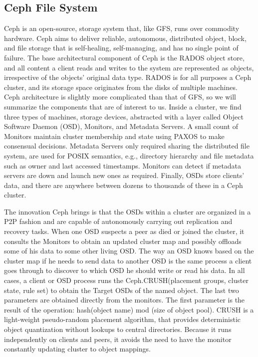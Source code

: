 \documentclass[runningheads]{llncs}
\begin{document}
\newpage\subsection{Ceph File System}
Ceph \cite{ceph} is an open-source, storage system that, like GFS, runs over commodity hardware. Ceph aims to deliver reliable, autonomous, distributed object, block, and file storage that is self-healing, self-managing, and has no single point of failure. The base architectural component of Ceph is the RADOS object store, and all content a client reads and writes to the system are represented as objects, irrespective of the objects' original data type. RADOS is for all purposes a Ceph cluster, and its storage space originates from the disks of multiple machines. Ceph architecture is slightly more complicated than that of GFS, so we will summarize the components that are of interest to us. Inside a cluster, we find three types of machines, storage devices, abstracted with a layer called Object Software Daemon (OSD), Monitors, and Metadata Servers. A small count of Monitors maintain cluster membership and state using PAXOS \cite{paxos} to make consensual decisions. Metadata Servers only required sharing the distributed file system, are used for POSIX semantics, e.g., directory hierarchy and file metadata such as owner and last accessed timestamps. Monitors can detect if metadata servers are down and launch new ones as required. Finally, OSDs store clients' data, and there are anywhere between dozens to thousands of these in a Ceph cluster.

The innovation Ceph brings is that the OSDs within a cluster are organized in a P2P fashion and are capable of autonomously carrying out replication and recovery tasks. When one OSD suspects a peer as died or joined the cluster, it consults the Monitors to obtain an updated cluster map and possibly offloads some of his data to some other living OSD. The way an OSD knows based on the cluster map if he needs to send data to another OSD is the same process a client goes through to discover to which OSD he should write or read his data. In all cases, a client or OSD process runs the Ceph.CRUSH(placement groups, cluster state, rule set) to obtain the Target OSDs of the named object. The last two parameters are obtained directly from the monitors. The first parameter is the result of the operation: hash(object name) mod (size of object pool). CRUSH \cite{crush} is a light-weight pseudo-random placement algorithm, that provides deterministic object quantization without lookups to central directories. Because it runs independently on clients and peers, it avoids the need to have the monitor constantly updating cluster to object mappings.
\end{document}
